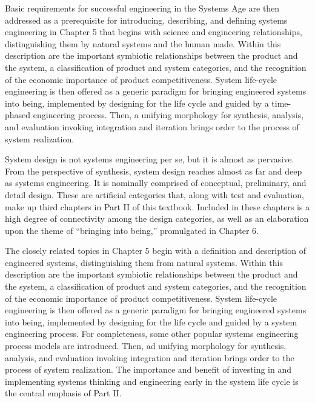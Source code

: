Basic requirements for successful engineering in the Systems Age are then addressed as a prerequisite for introducing, describing, and defining systems engineering in Chapter 5 that begins with science and engineering relationships, distinguishing them by natural systems and the human made. Within this description are the important symbiotic relationships between the product and the system, a classification of product and system categories, and the recognition of the economic importance of product competitiveness. System life-cycle engineering is then offered as a generic paradigm for bringing engineered systems into being, implemented by designing for the life cycle and guided by a time-phased engineering process. Then, a unifying morphology for synthesis, analysis, and evaluation invoking integration and iteration brings order to the process of system realization.

System design is not systems engineering per se, but it is almost as pervasive. From the perspective of synthesis, system design reaches almost as far and deep as systems engineering. It is nominally comprised of conceptual, preliminary, and detail design. These are artificial categories that, along with test and evaluation, make up third chapters in Part II of this textbook. Included in these chapters is a high degree of connectivity among the design categories, as well as an elaboration upon the theme of ``bringing into being,'' promulgated in Chapter 6.

The closely related topics in Chapter 5 begin with a definition and description of engineered systems, distinguishing them from natural systems. Within this description are the important symbiotic relationships between the product and the system, a classification of product and system categories, and the recognition of the economic importance of product competitiveness. System life-cycle engineering is then offered as a generic paradigm for bringing engineered systems into being, implemented by designing for the life cycle and guided by a system engineering process. For completeness, some other popular systems engineering process models are introduced. Then, ad unifying morphology for synthesis, analysis, and evaluation invoking integration and iteration brings order to the process of system realization. The importance and benefit of investing in and implementing systems thinking and engineering early in the system life cycle is the central emphasis of Part II.